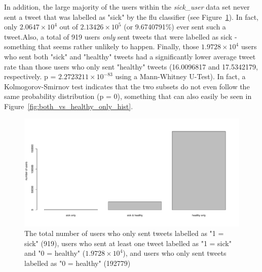 \documentclass[11pt, a4paper]{report}\usepackage[]{graphicx}\usepackage[]{color}
\begin{document}
In addition, the large majority of the users within the \textit{sick\_user} data set never sent a tweet that was labelled as "sick" by the flu classifier (see Figure~\ref{fig:barplot_sick_df}). In fact, only \ensuremath{2.0647\times 10^{4}} out of \ensuremath{2.13426\times 10^{5}} (or 9.6740791\%) ever sent such a tweet.\newline Also, a total of 919 users \textit{only} sent tweets that were labelled as sick - something that seems rather unlikely to happen. Finally, those \ensuremath{1.9728\times 10^{4}} users who sent both "sick" and "healthy" tweets had a significantly lower average tweet rate than those users who only sent "healthy" tweets (16.0096817 and 17.5342179, respectively. p = \ensuremath{2.2723211\times 10^{-83}} using a Mann-Whitney U-Test). In fact, a Kolmogorov-Smirnov test indicates that the two subsets do not even follow the same probability distribution (p = 0), something that can also easily be seen in Figure~\ref{fig:both_vs_healthy_only_hist}.

\begin{figure}[h]
\centering
\includegraphics[width=1\linewidth]{barplot_sick_raw_df.pdf}
\caption{The total number of users who only sent tweets labelled as "1 = sick" (919), users who sent at least one tweet labelled as "1 = sick" and "0 = healthy" (\ensuremath{1.9728\times 10^{4}}), and users who only sent tweets labelled as "0 = healthy" (192779)}
\label{fig:barplot_sick_df}
\end{figure}
\end{document}
